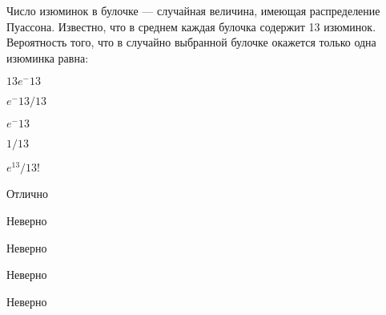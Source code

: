 
\begin{question}
Число изюминок в булочке --- случайная величина, имеющая распределение
Пуассона. Известно, что в среднем каждая булочка содержит 13 изюминок.
Вероятность того, что в случайно выбранной булочке окажется только одна
изюминка равна:
\begin{answerlist}
  \item \(13e^-13\)
  \item \(e^-13/13\)
  \item \(e^-13\)
  \item \(1/13\)
  \item \(e^13/13!\)
\end{answerlist}
\end{question}

\begin{solution}
\begin{answerlist}
  \item Отлично
  \item Неверно
  \item Неверно
  \item Неверно
  \item Неверно
\end{answerlist}
\end{solution}

